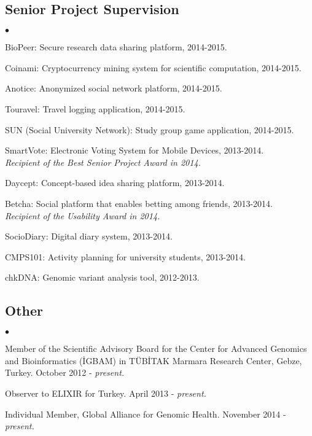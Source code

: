 \documentclass[margin,line]{res}
\newenvironment{list2}{
  \begin{list}{$\bullet$}{%
      \setlength{\itemsep}{0in}
      \setlength{\parsep}{0in} \setlength{\parskip}{0in}
      \setlength{\topsep}{0in} \setlength{\partopsep}{0in} 
      \setlength{\leftmargin}{0.2in}}}{\end{list}}
\begin{document}
\begin{resume}
\subsection{\small \sc Senior Project Supervision}
\begin{list2}
  \item BioPeer: Secure research data sharing platform, 2014-2015.
  \item Coinami: Cryptocurrency mining system for scientific computation, 2014-2015.
  \item Anotice: Anonymized social network platform, 2014-2015.
  \item Touravel: Travel logging application, 2014-2015. 
  \item SUN (Social University Network): Study group game application, 2014-2015.
  \item SmartVote: Electronic Voting System for Mobile Devices, 2013-2014. \\
    {\it Recipient of the Best Senior Project Award in 2014.}
  \item Daycept: Concept-based idea sharing platform, 2013-2014.
  \item Betcha: Social platform that enables betting among friends, 2013-2014.\\
    {\it Recipient of the Usability Award in 2014.}
  \item SocioDiary: Digital diary system, 2013-2014.
  \item CMPS101: Activity planning for university students, 2013-2014.
  \item chkDNA: Genomic variant analysis tool, 2012-2013.
\end{list2}


\vspace{-0.6cm}
\subsection{\small \sc Other}
\begin{list2}
\item
  Member of the Scientific Advisory Board for the Center for Advanced Genomics and Bioinformatics (\.{I}GBAM)
  in T\"{U}B\.{I}TAK Marmara Research Center, Gebze, Turkey. October 2012 - {\it present.}
\item
  Observer to ELIXIR for Turkey. April 2013 - {\it present.}
\item
  Individual Member, Global Alliance for Genomic Health. November 2014 - {\it present.}
\end{list2}



\end{resume}
\end{document}
